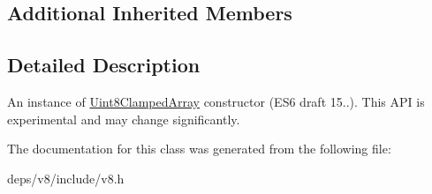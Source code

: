 \subsection*{Additional Inherited Members}


\subsection{Detailed Description}
An instance of \hyperlink{classv8_1_1_uint8_clamped_array}{Uint8\+Clamped\+Array} constructor (E\+S6 draft 15..). This A\+P\+I is experimental and may change significantly. 

The documentation for this class was generated from the following file\+:\begin{DoxyCompactItemize}
\item 
deps/v8/include/v8.\+h\end{DoxyCompactItemize}
